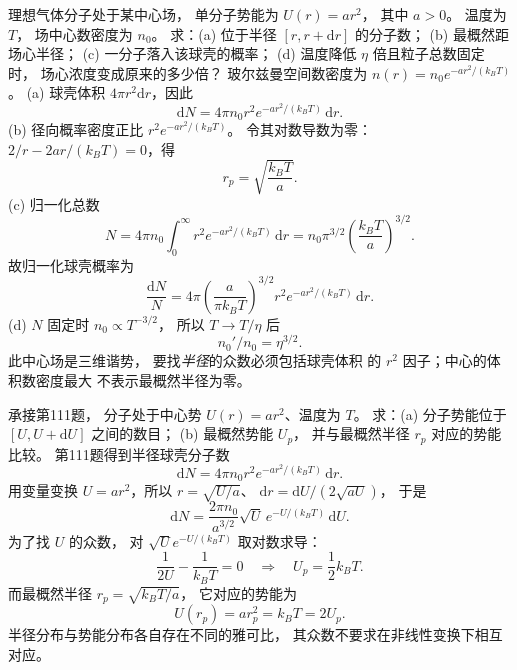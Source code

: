 理想气体分子处于某中心场，
单分子势能为 $U(r)=ar^2$，
其中 $a>0$。
温度为 $T$，
场中心数密度为 $n_0$。
求：(a) 位于半径 $[r,r+\mathrm dr]$ 的分子数；
(b) 最概然距场心半径；
(c) 一分子落入该球壳的概率；
(d) 温度降低 $\eta$ 倍且粒子总数固定时，
场心浓度变成原来的多少倍？
\exsolution
玻尔兹曼空间数密度为
$n(r)=n_0e^{-ar^2/(k_BT)}$。
(a) 球壳体积 $4\pi r^2\mathrm dr$，因此
\[
\boxed{\mathrm dN=4\pi n_0r^2
e^{-ar^2/(k_BT)}\,\mathrm dr}.
\]
(b) 径向概率密度正比
$r^2e^{-ar^2/(k_BT)}$。
令其对数导数为零：
$2/r-2ar/(k_BT)=0$，得
\[
\boxed{r_p=\sqrt{\frac{k_BT}{a}}}.
\]
(c) 归一化总数
\[
N=4\pi n_0\int_0^\infty
r^2e^{-ar^2/(k_BT)}\,\mathrm dr
=n_0\pi^{3/2}\left(\frac{k_BT}{a}\right)^{3/2}.
\]
故归一化球壳概率为
\[
\boxed{\frac{\mathrm dN}{N}=
4\pi\left(\frac{a}{\pi k_BT}\right)^{3/2}
r^2e^{-ar^2/(k_BT)}\,\mathrm dr}.
\]
(d) $N$ 固定时 $n_0\propto T^{-3/2}$，
所以 $T\to T/\eta$ 后
\[
\boxed{n_0'/n_0=\eta^{3/2}}.
\]
\excheck 此中心场是三维谐势，
要找\emph{半径}的众数必须包括球壳体积
的 $r^2$ 因子；中心的体积数密度最大
不表示最概然半径为零。

承接第111题，
分子处于中心势
$U(r)=ar^2$、温度为 $T$。
求：(a) 分子势能位于
$[U,U+\mathrm dU]$ 之间的数目；
(b) 最概然势能 $U_p$，
并与最概然半径 $r_p$ 对应的势能比较。
\exsolution
第111题得到半径球壳分子数
\[
\mathrm dN=4\pi n_0r^2
e^{-ar^2/(k_BT)}\,\mathrm dr.
\]
用变量变换
$U=ar^2$，所以
$r=\sqrt{U/a}$、
$\mathrm dr=\mathrm dU/(2\sqrt{aU})$，
于是
\[
\boxed{\mathrm dN=
\frac{2\pi n_0}{a^{3/2}}
\sqrt U\,e^{-U/(k_BT)}\,\mathrm dU}.
\]
为了找 $U$ 的众数，
对 $\sqrt Ue^{-U/(k_BT)}$ 取对数求导：
\[
\frac1{2U}-\frac1{k_BT}=0
\quad\Longrightarrow\quad
\boxed{U_p=\frac12k_BT}.
\]
而最概然半径
$r_p=\sqrt{k_BT/a}$，
它对应的势能为
\[
\boxed{U(r_p)=ar_p^2=k_BT=2U_p}.
\]
\excheck 半径分布与势能分布各自存在不同的雅可比，
其众数不要求在非线性变换下相互对应。
